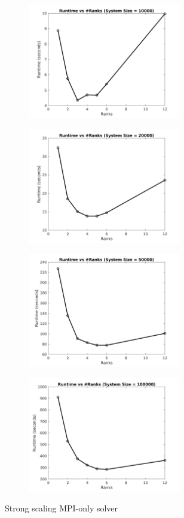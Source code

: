 \documentclass[sigplan,screen]{acmart}
\begin{document}
\begin{figure}
\begin{subfigure}{0.4\textwidth}
		\caption{}
	\end{subfigure}
	\begin{subfigure}{0.4\textwidth}
		\includegraphics[trim= 20 5 35 10,clip, width=0.95\linewidth, height=5cm]{MPI_strong_10k.png}
		\caption{}
	\end{subfigure}
	\begin{subfigure}{0.4\textwidth}
		\includegraphics[trim= 20 5 35 10,clip, width=0.95\linewidth, height=5cm]{MPI_strong_20k.png} 
		\caption{}
	\end{subfigure}
	\begin{subfigure}{0.4\textwidth}
		\includegraphics[trim= 20 5 35 10,clip, width=0.95\linewidth, height=5cm]{MPI_strong_50k.png}
		\caption{}
	\end{subfigure}
	\begin{subfigure}{0.4\textwidth}
		\includegraphics[trim= 20 5 35 10,clip, width=0.95\linewidth, height=5cm]{MPI_strong_100k.png}
		\caption{}
	\end{subfigure}
	\caption{Strong scaling MPI-only solver}
	\label{strong1}
\end{figure}
\end{document}
